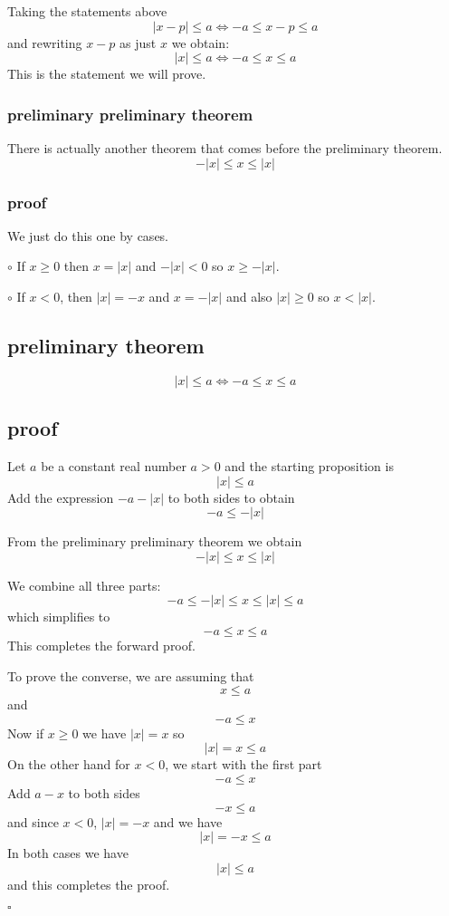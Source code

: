 \documentclass[11pt, oneside]{article}
\begin{document}
Taking the statements above
\[ |x - p| \le a \iff -a \le x - p \le a \]
and rewriting $x -p$ as just $x$ we obtain:  
\[ |x| \le a \iff -a \le x \le a \]
This is the statement we will prove.

\subsubsection*{preliminary preliminary theorem}

There is actually another theorem that comes before the preliminary theorem.
\[ -|x| \le x \le |x| \]

\subsubsection*{proof}

We just do this one by cases.

$\circ$   If $x \ge 0$ then $x = |x|$ and $-|x| < 0$ so $x \ge -|x|$.

$\circ$   If $x < 0$, then $|x|=-x$ and $x = -|x|$ and also $|x| \ge 0$ so $x < |x|$.

\subsection*{preliminary theorem}

\[ |x| \le a \iff -a \le x \le a \]

\subsection*{proof}
Let $a$ be a constant real number $a > 0$ and the starting proposition is
\[ |x| \le a \]
Add the expression $-a - |x|$ to both sides to obtain
\[ -a \le - |x| \]

From the preliminary preliminary theorem we obtain
\[ -|x| \le x \le |x| \]

We combine all three parts:
\[ -a \le -|x| \le x \le |x| \le a \]
which simplifies to
\[ -a \le x \le a \]
This completes the forward proof.

To prove the converse, we are assuming that
\[ x \le a \]
and
\[ - a \le x \]
Now if $x \ge 0$ we have $|x| = x$ so
\[ |x| = x \le a \]
On the other hand for $x < 0$, we start with the first part
\[ -a \le x \]
Add $a - x$ to both sides
\[ -x \le a \]
and since $x < 0$, $|x| = -x$ and we have 
\[ |x| =  -x \le a \]
In both cases we have \[ |x| \le a \]
and this completes the proof.

$\square$
\end{document}
